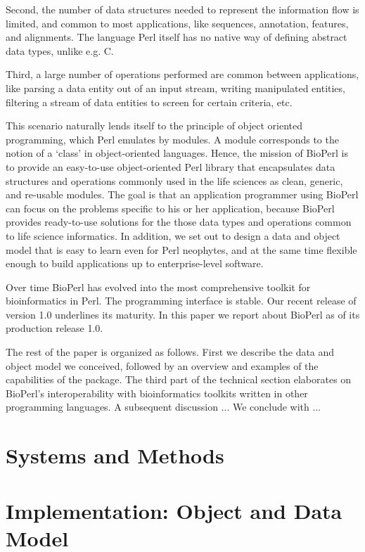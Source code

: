 \documentclass{article}
\begin{document}
\begin{twocolumn}
Second, the number of data structures needed to represent the
information flow is limited, and common to most applications, like
sequences, annotation, features, and alignments. The language Perl
itself has no native way of defining abstract data types, unlike
e.g. C.

Third, a large number of operations performed are common between
applications, like parsing a data entity out of an input stream,
writing manipulated entities, filtering a stream of data entities to
screen for certain criteria, etc. 

This scenario naturally lends itself to the principle of object
oriented programming, which Perl emulates by modules. A module
corresponds to the notion of a `class' in object-oriented languages.
Hence, the mission of BioPerl is to provide an easy-to-use
object-oriented Perl library that encapsulates data structures and
operations commonly used in the life sciences as clean, generic, and
re-usable modules. The goal is that an application programmer using
BioPerl can focus on the problems specific to his or her application,
because BioPerl provides ready-to-use solutions for the those data
types and operations common to life science informatics. In addition,
we set out to design a data and object model that is easy to learn
even for Perl neophytes, and at the same time flexible enough to build
applications up to enterprise-level software.

Over time BioPerl has evolved into the most comprehensive toolkit for
bioinformatics in Perl. The programming interface is stable. Our
recent release of version 1.0 underlines its maturity.  In this paper
we report about BioPerl as of its production release 1.0.

The rest of the paper is organized as follows. First we describe the
data and object model we conceived, followed by an overview and
examples of the capabilities of the package. The third part of the
technical section elaborates on BioPerl's interoperability with
bioinformatics toolkits written in other programming languages. A
subsequent discussion ... We conclude with ...


\section{Systems and Methods}

\section{Implementation: Object and Data Model}


\end{twocolumn}
\end{document}
